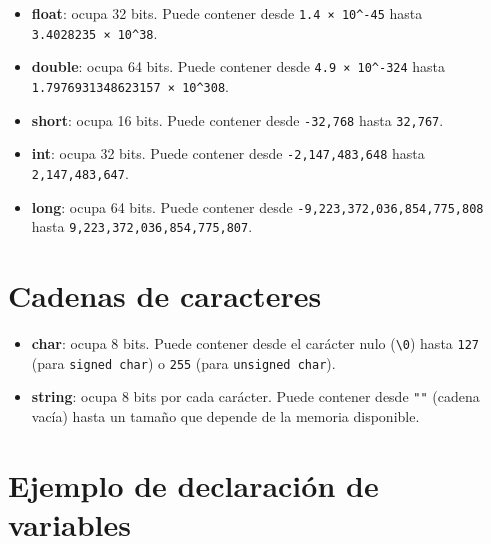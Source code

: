 \documentclass[
  11pt,
  a4paper,
  DIV=11,
  numbers=noendperiod]{scrreprt}
\providecommand{\tightlist}{%
  \setlength{\itemsep}{0pt}\setlength{\parskip}{0pt}}
\begin{document}
\begin{itemize}
\tightlist
\item
  \textbf{float}: ocupa 32 bits. Puede contener desde
  \texttt{1.4\ ×\ 10\^{}-45} hasta \texttt{3.4028235\ ×\ 10\^{}38}.
\item
  \textbf{double}: ocupa 64 bits. Puede contener desde
  \texttt{4.9\ ×\ 10\^{}-324} hasta
  \texttt{1.7976931348623157\ ×\ 10\^{}308}.
\item
  \textbf{short}: ocupa 16 bits. Puede contener desde \texttt{-32,768}
  hasta \texttt{32,767}.
\item
  \textbf{int}: ocupa 32 bits. Puede contener desde
  \texttt{-2,147,483,648} hasta \texttt{2,147,483,647}.
\item
  \textbf{long}: ocupa 64 bits. Puede contener desde
  \texttt{-9,223,372,036,854,775,808} hasta
  \texttt{9,223,372,036,854,775,807}.
\end{itemize}

\section{Cadenas de caracteres}\label{cadenas-de-caracteres}

\begin{itemize}
\tightlist
\item
  \textbf{char}: ocupa 8 bits. Puede contener desde el carácter nulo
  (\texttt{\textquotesingle{}\textbackslash{}0\textquotesingle{}}) hasta
  \texttt{127} (para \texttt{signed\ char}) o \texttt{255} (para
  \texttt{unsigned\ char}).
\item
  \textbf{string}: ocupa 8 bits por cada carácter. Puede contener desde
  \texttt{""} (cadena vacía) hasta un tamaño que depende de la memoria
  disponible.
\end{itemize}

\section{Ejemplo de declaración de
variables}\label{ejemplo-de-declaraciuxf3n-de-variables}
\end{document}

